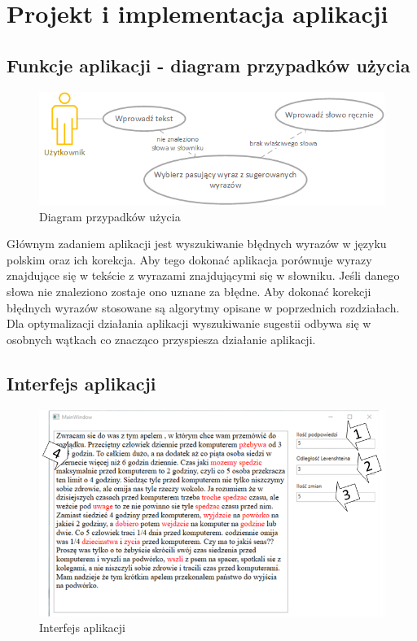 \chapter{Projekt i implementacja aplikacji}

\section{Funkcje aplikacji - diagram przypadków użycia}

\begin{figure} [H]
	\centering
	\includegraphics[width=1\linewidth]{rozdzial03/diagram.png}
	\caption{Diagram przypadków użycia}
	\label{fig:diagUzycia}
\end{figure}

Głównym zadaniem aplikacji jest wyszukiwanie błędnych wyrazów w języku polskim oraz ich korekcja. Aby tego dokonać aplikacja porównuje wyrazy znajdujące się w tekście z wyrazami znajdującymi się w słowniku. Jeśli danego słowa nie znaleziono zostaje ono uznane za błędne. Aby dokonać korekcji błędnych wyrazów stosowane są algorytmy opisane w poprzednich rozdziałach. Dla optymalizacji działania aplikacji wyszukiwanie sugestii odbywa się w osobnych wątkach co znacząco przyspiesza działanie aplikacji. 


\section{Interfejs aplikacji}

\begin{figure} [H]
	\centering
	\includegraphics[width=1\linewidth]{rozdzial03/screen1_1.png}
	\caption{Interfejs aplikacji}
	\label{fig:interfejs}
\end{figure}

